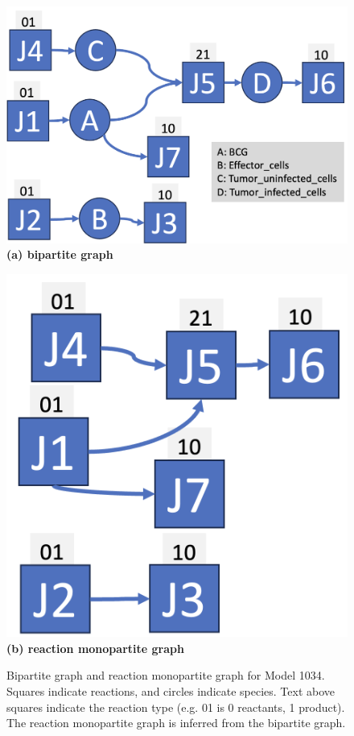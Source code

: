 \documentclass[webpdf,contemporary,large]{oup-authoring-template}
\theoremstyle{thmstyleone}%
\theoremstyle{thmstyletwo}%
\theoremstyle{thmstylethree}%
\begin{document}
\begin{figure}
\centering
\hspace{-0.2in}
\begin{minipage}{1.1in}
\includegraphics[width=1.25\textwidth, angle=0]{figures/bipartite-graph.png}
{\tiny {\bf (a) bipartite graph}}
\label{fig:bipartite-graph}
\end{minipage}
\hspace{0.5in}
\begin{minipage}{0.9in}
\includegraphics[width=1.25\textwidth, angle=0]{figures/monopartite-graph.png}
{\tiny {\bf (b) reaction monopartite graph}}
\label{fig:monopartite-graph}
\end{minipage}
\caption{Bipartite graph and reaction monopartite graph for Model 1034.
Squares indicate reactions, and circles indicate species. Text above squares indicate the reaction type (e.g. 01 is 0 reactants, 1 product). The reaction monopartite graph is inferred from the bipartite graph.}
\label{fig:bipartite}
\end{figure}
 
\end{document}
